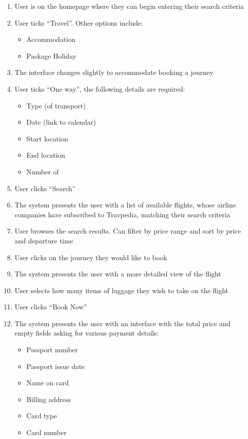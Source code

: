 \begin{enumerate}
	\item User is on the homepage where they can begin entering their search
		criteria
	\item User ticks ``Travel''. Other options include:
	\begin{itemize}
		\item Accommodation
		\item Package Holiday
	\end{itemize}
	\item The interface changes slightly to accommodate booking a journey
	\item User ticks ``One way'',  the following details are required:
	\begin{itemize}
		\item Type (of transport)
		\item Date (link to calendar)
		\item Start location
		\item End location
		\item Number of
	\end{itemize}
	\item User clicks ``Search''
	\item The system presents the user with a list of available flights, whose
		airline companies have subscribed to Travpedia, matching their search
		criteria
	\item User browses the search results. Can filter by price range and sort
		by price and departure time
	\item User clicks on the journey they would like to book
	\item The system presents the user with a more detailed view of the flight
	\item User selects how many items of luggage they wish to take on the
		flight
	\item User clicks ``Book Now''
	\item The system presents the user with an interface with the total price
		and empty fields asking for various payment details:
	\begin{itemize}
		\item Passport number
		\item Passport issue date
		\item Name on card
		\item Billing address
		\item Card type
		\item Card number

\end{itemize}
\end{enumerate}
